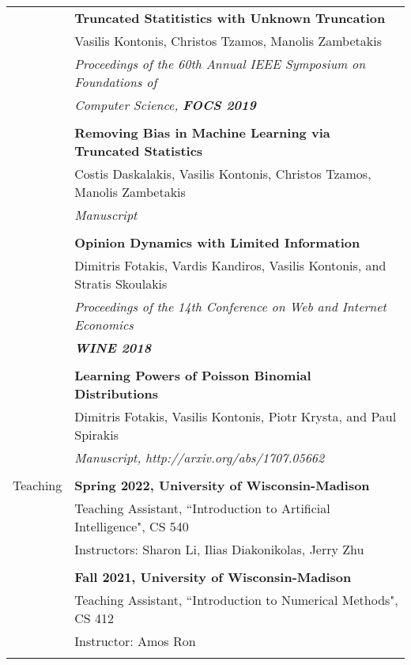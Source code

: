 \documentclass[letterpaper,11pt,oneside]{article}
\begin{document}
\begin{longtable}{@{} l l}
     & \textbf{Truncated Statitistics with Unknown Truncation} \\
     & Vasilis Kontonis, Christos Tzamos, Manolis Zambetakis\\
     & \emph{Proceedings of the 60th Annual IEEE Symposium on Foundations of}\\
     & \emph{Computer Science, \textbf{FOCS 2019}}\\
     & \\

     & \textbf{Removing Bias in Machine Learning via Truncated Statistics} \\
     & Costis Daskalakis, Vasilis Kontonis, Christos Tzamos, Manolis Zambetakis\\
     & \emph{Manuscript} \\
     & \\

     & \textbf{Opinion Dynamics with Limited Information} \\
     & Dimitris Fotakis, Vardis Kandiros, Vasilis Kontonis, and Stratis Skoulakis\\
     & \emph{Proceedings of the 14th Conference on Web and Internet Economics} \\
     & \emph{\textbf{WINE 2018}} \\
     & \\

     & \textbf{Learning Powers of Poisson Binomial Distributions} \\
     & Dimitris Fotakis, Vasilis Kontonis, Piotr Krysta, and Paul Spirakis\\
     & \emph{Manuscript, http://arxiv.org/abs/1707.05662} \\
     & \\

  \Large{Teaching}

  & \textbf{Spring 2022, University of Wisconsin-Madison} \\
  & Teaching Assistant, ``Introduction to Artificial Intelligence", CS 540\\
  & Instructors: Sharon Li, Ilias Diakonikolas, Jerry Zhu \\
  & \\

  & \textbf{Fall 2021, University of Wisconsin-Madison} \\
  & Teaching Assistant, ``Introduction to Numerical Methods", CS 412\\
  & Instructor: Amos Ron\\
  & \\


\end{longtable}
\end{document}

